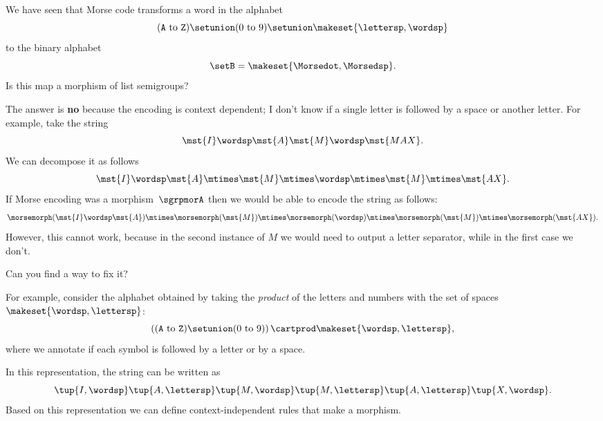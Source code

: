 \begin{exercise}
    We have seen that Morse code transforms a word in the alphabet
    \begin{equation}
        (\texttt{A} \ \text{to}\ \texttt{Z})
        \setunion (0 \ \text{to}\ 9) \setunion \makeset{\lettersp, \wordsp}
    \end{equation}
    to the binary alphabet
    \begin{equation}
        \setB = \makeset{\Morsedot, \Morsedsp}.
    \end{equation}
    Is this map a morphism of list semigroups?
\end{exercise}
%
\begin{solution}
    The answer is \textbf{no} because the encoding is context dependent; I don't know if a single letter is followed by a space or another letter.
    For example, take the string
    \begin{equation}
        \label{eq:max-iammax}
        \mst {I} \wordsp \mst{A} \mst{M}\wordsp \mst{MAX}.
    \end{equation}
    We can decompose it as follows
    \begin{equation}
        \label{eq:max-iammax-decomp}
        \mst{I}\wordsp \mst{A}\mtimes \mst{M} \mtimes \wordsp \mtimes \mst{M} \mtimes \mst{AX}.
    \end{equation}
    If Morse encoding was a morphism~$\sgrpmorA$ then we would be able to encode the string as follows:
    \begin{equation}
        \label{eq:max-iammax-decomp-morph}
        \morsemorph(\mst{I}\wordsp \mst{A}) \mtimes \morsemorph (\mst{M}) \mtimes  \morsemorph(\wordsp) \mtimes  \morsemorph(\mst{M})
        \mtimes  \morsemorph(\mst{AX}).
    \end{equation}
    However, this cannot work, because in the second instance of $M$ we would need to output a letter separator, while in the first case we don't.

    Can you find a way to fix it?

    For example, consider the alphabet obtained by taking the \emph{product} of the letters and numbers with the set of spaces~$\makeset{\wordsp, \lettersp}$:
    \begin{equation}
        \left( (\texttt{A} \ \text{to}\ \texttt{Z}) \setunion (0 \ \text{to}\ 9) \right) \cartprod \makeset{\wordsp, \lettersp},
    \end{equation}
    where we annotate if each symbol is followed by a letter or by a space.

    In this representation, the string can be written as
    \begin{equation}
        \tup{I, \wordsp} \tup{A, \lettersp} \tup{ M, \wordsp} \tup{M, \lettersp} \tup{A, \lettersp}
        \tup{X, \wordsp}.
    \end{equation}
    Based on this representation we can define context-independent rules that make a morphism.
\end{solution}


